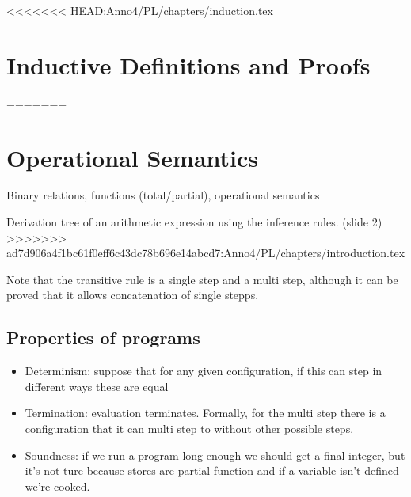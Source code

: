 % 
<<<<<<< HEAD:Anno4/PL/chapters/induction.tex
\chapter{Inductive Definitions and Proofs}
=======
\chapter{Operational Semantics}

Binary relations, functions (total/partial), operational semantics

Derivation tree of an arithmetic expression using the inference rules. (slide 2)
>>>>>>> ad7d906a4f1bc61f0eff6c43dc78b696e14abcd7:Anno4/PL/chapters/introduction.tex


Note that the transitive rule is a single step and a multi step, although it can be proved that it allows concatenation of single stepps.

\section{Properties of programs}
\begin{itemize}
\item Determinism: suppose that for any given configuration, if this can step in different ways these are equal
  \item Termination: evaluation terminates. Formally, for the multi step there is a configuration that it can multi step to without other possible steps.
    \item Soundness: if we run a program long enough we should get a final integer, but it's not ture because stores are partial function and if a variable isn't defined we're cooked.
\end{itemize}



